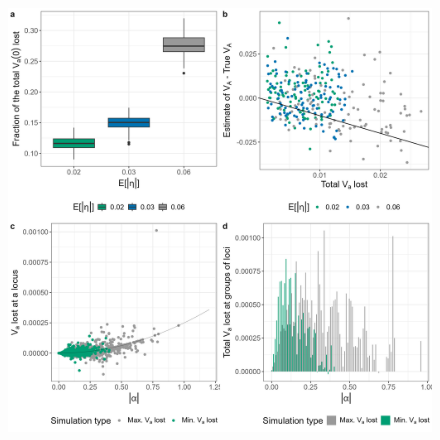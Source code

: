 \documentclass[12pt]{article}
\providecommand{\DIFaddbeginFL}{} %
\providecommand{\DIFaddendFL}{} %
\providecommand{\DIFdelbeginFL}{} %
\providecommand{\DIFdelendFL}{} %
\newcommand{\DIFscaledelfig}{0.5}
\newlength{\DIFdelgraphicswidth} %
\newlength{\DIFdelgraphicsheight} %
\newcommand{\DIFaddincludegraphics}[2][]{{\color{blue}\fbox{\DIFOincludegraphics[#1]{#2}}}} %
\newcommand{\DIFdelincludegraphics}[2][]{%
\sbox{\DIFdelgraphicsbox}{\DIFOincludegraphics[#1]{#2}}%
\settoboxwidth{\DIFdelgraphicswidth}{\DIFdelgraphicsbox} %
\settoboxtotalheight{\DIFdelgraphicsheight}{\DIFdelgraphicsbox} %
\scalebox{\DIFscaledelfig}{%
\parbox[b]{\DIFdelgraphicswidth}{\usebox{\DIFdelgraphicsbox}\\[-\baselineskip] \rule{\DIFdelgraphicswidth}{0em}}\llap{\resizebox{\DIFdelgraphicswidth}{\DIFdelgraphicsheight}{%
\setlength{\unitlength}{\DIFdelgraphicswidth}%
\begin{picture}(1,1)%
\thicklines\linethickness{2pt} %
{\color[rgb]{1,0,0}\put(0,0){\framebox(1,1){}}}%
{\color[rgb]{1,0,0}\put(0,0){\line( 1,1){1}}}%
{\color[rgb]{1,0,0}\put(0,1){\line(1,-1){1}}}%
\end{picture}%
}\hspace*{3pt}}} %
} %
\DeclareRobustCommand{\DIFaddbeginFL}{\DIFOaddbeginFL \let\includegraphics\DIFaddincludegraphics} %
\DeclareRobustCommand{\DIFaddendFL}{\DIFOaddendFL \let\includegraphics\DIFOincludegraphics} %
\DeclareRobustCommand{\DIFdelbeginFL}{\DIFOdelbeginFL \let\includegraphics\DIFdelincludegraphics} %
\DeclareRobustCommand{\DIFdelendFL}{\DIFOaddendFL \let\includegraphics\DIFOincludegraphics} %
\begin{document}
\begin{bibunit}
\begin{figure}[p]
\begin{center}
\DIFdelbeginFL %
\DIFdelendFL \DIFaddbeginFL \includegraphics[scale = 0.11]{Figures/lost_va.jpg}
\DIFaddendFL \end{center}

\end{figure}
\end{bibunit}
\end{document}
